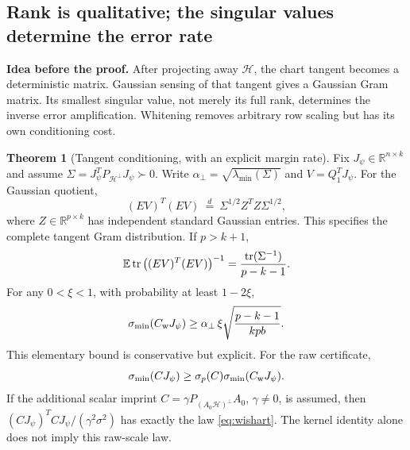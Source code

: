 \documentclass[11pt,a4paper]{article}
\theoremstyle{definition}
\newtheorem{theorem}{Theorem}[section]
\theoremstyle{definition}
\theoremstyle{remark}\newtheorem{remark}[theorem]{Remark}
\newcommand{\R}{\mathbb R}\newcommand{\Prob}{\mathbb P}\newcommand{\E}{\mathbb E}
\newcommand{\HH}{\mathcal H}\newcommand{\XX}{\mathcal X}\newcommand{\col}{\operatorname{col}}
\newcommand{\smin}{\sigma_{\min}}\newcommand{\smax}{\sigma_{\max}}
\newcommand{\proj}[1]{P_{#1}}
\newcommand{\proofidea}[1]{\par\textcolor{chartblue}{\textbf{Idea before the proof.}} #1\par}
\begin{document}
\subsection{Rank is qualitative; the singular values determine the error rate}

\proofidea{After projecting away $\HH$, the chart tangent becomes a deterministic matrix. Gaussian sensing of that tangent gives a Gaussian Gram matrix. Its smallest singular value, not merely its full rank, determines the inverse error amplification. Whitening removes arbitrary row scaling but has its own conditioning cost.}

\begin{theorem}[Tangent conditioning, with an explicit margin rate]\label{thm:conditioning}
Fix $J_\psi\in\R^{n\times k}$ and assume $\Sigma=J_\psi^T\proj{\HH^\perp}J_\psi\succ0$. Write $\alpha_\perp=\sqrt{\lambda_{\min}(\Sigma)}$ and $V=Q_1^TJ_\psi$. For the Gaussian quotient,
\begin{equation}\label{eq:wishart}
(EV)^T(EV)\ \stackrel{d}=\ \Sigma^{1/2}Z^TZ\Sigma^{1/2},
\end{equation}
where $Z\in\R^{p\times k}$ has independent standard Gaussian entries. This specifies the complete tangent Gram distribution. If $p>k+1$,
\begin{equation}\label{eq:invwishart}
\E\tr\big((EV)^T(EV)\big)^{-1}=\frac{\tr(\Sigma^{-1})}{p-k-1}.
\end{equation}
For any $0<\xi<1$, with probability at least $1-2\xi$,
\begin{equation}\label{eq:whitenrate}
\smin(C_{\rm w}J_\psi)\ge
\alpha_\perp\,\xi\sqrt{\frac{p-k-1}{kpb}}.
\end{equation}
This elementary bound is conservative but explicit. For the raw certificate,
\[
\smin(CJ_\psi)\ge\sigma_p(C)\smin(C_{\rm w}J_\psi).
\]
If the additional scalar imprint $C=\gamma P_{(A_0\HH)^\perp}A_0$, $\gamma\ne0$, is assumed, then $(CJ_\psi)^TCJ_\psi/(\gamma^2\sigma^2)$ has exactly the law \eqref{eq:wishart}. The kernel identity alone does not imply this raw-scale law.
\end{theorem}
\end{document}
